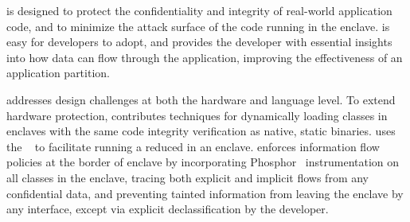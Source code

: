 \sysname{} is designed to protect the confidentiality and integrity of 
real-world application code,
and to minimize the attack surface of the code running in the enclave.
\sysname{} is easy for developers to adopt, and provides the developer
with essential insights into how data can flow through the application,
improving the effectiveness of an application partition.

\sysname{} addresses design challenges at both the hardware and language level.
To extend hardware protection, \sysname{} contributes techniques for dynamically loading \java{} classes in enclaves
with the same code integrity verification as native, static binaries.
\sysname{} uses the \graphene{} \libos{}~\cite{tsai14graphene} to facilitate 
running a reduced \jvmname{} \jvm{} in an enclave.
\sysname{} enforces information flow policies at the border of enclave by incorporating
Phosphor~\cite{bell2014phosphor} instrumentation on all classes in the enclave,
tracing both explicit and implicit flows from any confidential data,
and preventing tainted information from leaving the enclave by any interface, 
except via explicit declassification by the developer.

